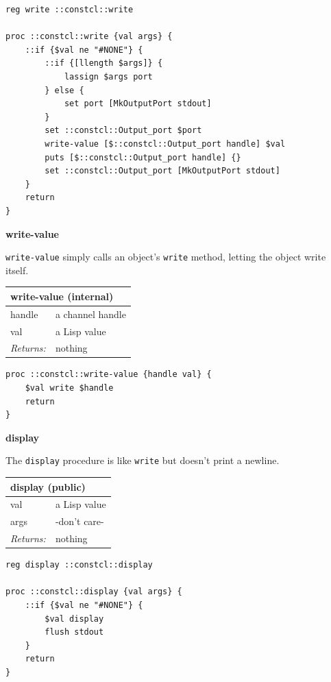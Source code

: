 \documentclass[twoside,9pt]{report}
\begin{document}
\noindent\makebox[\linewidth]{\rule{\linewidth}{0.4pt}}
\begin{lstlisting}
reg write ::constcl::write
 
proc ::constcl::write {val args} {
    ::if {$val ne "#NONE"} {
        ::if {[llength $args]} {
            lassign $args port
        } else {
            set port [MkOutputPort stdout]
        }
        set ::constcl::Output_port $port
        write-value [$::constcl::Output_port handle] $val
        puts [$::constcl::Output_port handle] {}
        set ::constcl::Output_port [MkOutputPort stdout]
    }
    return
}
\end{lstlisting}
\noindent\makebox[\linewidth]{\rule{\linewidth}{0.4pt}}

\textbf{write-value}


\texttt{write-value} simply calls an object's \texttt{write} method, letting the object write itself.

\begin{tabular}{ |l l| }
\hline
\multicolumn{2}{|l|}{write-value (internal)} \\
\hline
handle & a channel handle \\
val & a Lisp value \\
\textit{Returns:} & nothing \\
\hline
\end{tabular}

\noindent\makebox[\linewidth]{\rule{\linewidth}{0.4pt}}
\begin{lstlisting}
proc ::constcl::write-value {handle val} {
    $val write $handle
    return
}
\end{lstlisting}
\noindent\makebox[\linewidth]{\rule{\linewidth}{0.4pt}}

\textbf{display}


The \texttt{display} procedure is like \texttt{write} but doesn't print a newline.

\begin{tabular}{ |l l| }
\hline
\multicolumn{2}{|l|}{display (public)} \\
\hline
val & a Lisp value \\
args & -don't care- \\
\textit{Returns:} & nothing \\
\hline
\end{tabular}

\noindent\makebox[\linewidth]{\rule{\linewidth}{0.4pt}}
\begin{lstlisting}
reg display ::constcl::display
 
proc ::constcl::display {val args} {
    ::if {$val ne "#NONE"} {
        $val display
        flush stdout
    }
    return
}
\end{lstlisting}
\noindent\makebox[\linewidth]{\rule{\linewidth}{0.4pt}}
\end{document}
